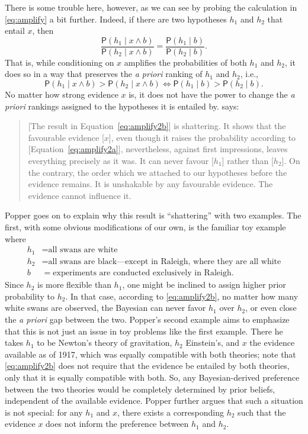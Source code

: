 \documentclass[a4paper, 12pt]{article}
\theoremstyle{plain}
\theoremstyle{definition}
\theoremstyle{remark}
\newcommand{\prob}{\mathsf{P}}
\begin{document}
There is some trouble here, however, as we can see by probing the calculation in \eqref{eq:amplify} a bit further.  Indeed, if there are two hypotheses $h_1$ and $h_2$ that entail $x$, then 
\begin{equation}
\label{eq:amplify2a}
\frac{\prob(h_1 \mid x \land b)}{\prob(h_2 \mid x \land b)} = \frac{\prob(h_1 \mid b)}{\prob(h_2 \mid b)}. 
\end{equation}
That is, while conditioning on $x$ amplifies the probabilities of both $h_1$ and $h_2$, it does so in a way that preserves the {\em a priori} ranking of $h_1$ and $h_2$, i.e., 
\begin{equation}
\label{eq:amplify2b}
\prob(h_1 \mid x \land b) > \prob(h_2 \mid x \land b) \iff \prob(h_1 \mid b) > \prob(h_2 \mid b). 
\end{equation} 
No matter how strong evidence $x$ is, it does not have the power to change the {\em a priori} rankings assigned to the hypotheses it is entailed by.  \citet[p.~343]{popper1985.realism} says: 
\begin{quote}
[The result in Equation~\eqref{eq:amplify2b}] is shattering. It shows that the favourable evidence [$x$], even though it raises the probability according to [Equation~\eqref{eq:amplify2a}], nevertheless, against first impressions, leaves everything precisely as it was. It can never favour [$h_1$] rather than [$h_2$]. On the contrary, the order which we attached to our hypotheses before the evidence remains. It is unshakable by any favourable evidence. The evidence cannot influence it. 
\end{quote}
Popper goes on to explain why this result is ``shattering'' with two examples.  The first, with some obvious modifications of our own, is the familiar toy example where 
\begin{align*}
h_1 & = \text{all swans are white} \\
h_2 & = \text{all swans are black---except in Raleigh, where they are all white} \\
b & = \text{experiments are conducted exclusively in Raleigh}.
\end{align*}
Since $h_2$ is more flexible than $h_1$, one might be inclined to assign higher prior probability to $h_2$.  In that case, according to \eqref{eq:amplify2b}, no matter how many white swans are observed, the Bayesian can never favor $h_1$ over $h_2$, or even close the {\em a priori} gap between the two.  Popper's second example aims to emphasize that this is not just an issue in toy problems like the first example.  There he takes $h_1$ to be Newton's theory of gravitation, $h_2$ Einstein's, and $x$ the evidence available as of 1917, which was equally compatible with both theories; note that \eqref{eq:amplify2b} does not require that the evidence be entailed by both theories, only that it is equally compatible with both.  So, any Bayesian-derived preference between the two theories would be completely determined by prior beliefs, independent of the available evidence.  Popper further argues that such a situation is not special: for any $h_1$ and $x$, there exists a corresponding $h_2$ such that the evidence $x$ does not inform the preference between $h_1$ and $h_2$. 
\end{document}
